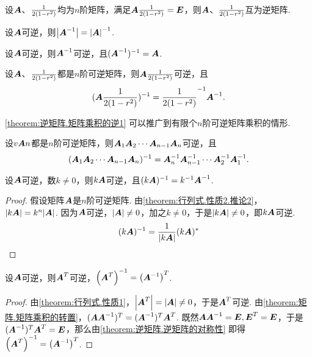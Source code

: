\begin{property}\label{theorem:逆矩阵.逆矩阵的对称性}
设\(\A\)、\(\B\)均为\(n\)阶矩阵，满足\(\A\B=\E\)，则\(\A\)、\(\B\)互为逆矩阵.
\end{property}

\begin{property}\label{theorem:逆矩阵.逆矩阵的行列式}
设\(\A\)可逆，则\(\abs{\A^{-1}}=\abs{\A}^{-1}\).
\end{property}

\begin{property}\label{theorem:逆矩阵.逆矩阵的逆}
设\(\A\)可逆，则\(\A^{-1}\)可逆，且\((\A^{-1})^{-1}=\A\).
\end{property}

\begin{property}\label{theorem:逆矩阵.矩阵乘积的逆1}
设\(\A\)、\(\B\)都是\(n\)阶可逆矩阵，则\(\A\B\)可逆，且\begin{equation}
(\A \B)^{-1} = \B^{-1} \A^{-1}.
\end{equation}
\end{property}

\cref{theorem:逆矩阵.矩阵乘积的逆1} 可以推广到有限个\(n\)阶可逆矩阵乘积的情形.
\begin{property}\label{theorem:逆矩阵.矩阵乘积的逆2}
设\(\v{\A}{n}\)都是\(n\)阶可逆矩阵，则\(\A_1 \A_2 \dotsm \A_{n-1} \A_n\)可逆，且\begin{equation}
(\A_1 \A_2 \dotsm \A_{n-1} \A_n)^{-1}
= \A_n^{-1} \A_{n-1}^{-1} \dotsm \A_2^{-1} \A_1^{-1}.
\end{equation}
\end{property}

\begin{property}\label{theorem:逆矩阵.数与矩阵乘积的逆}
设\(\A\)可逆，数\(k\neq0\)，则\(k\A\)可逆，且\((k\A)^{-1}=k^{-1}\A^{-1}\).
\begin{proof}
假设矩阵\(\A\)是\(n\)阶可逆矩阵.
由\cref{theorem:行列式.性质2.推论2}，\(\abs{k\A} = k^n\abs{\A}\).
因为\(\A\)可逆，\(\abs{\A}\neq0\)，加之\(k\neq0\)，于是\(\abs{k\A}\neq0\)，即\(k\A\)可逆.\[
(k\A)^{-1} = \frac{1}{\abs{k\A}} (k\A)^*
\]
\end{proof}
\end{property}

\begin{property}\label{theorem:逆矩阵.转置矩阵的逆与逆矩阵的转置}
设\(\A\)可逆，则\(\A^T\)可逆，\(\left(\A^T\right)^{-1}=\left(\A^{-1}\right)^T\).
\begin{proof}
由\cref{theorem:行列式.性质1}，\(\abs{\A^T}=\abs{\A}\neq0\)，于是\(\A^T\)可逆.
由\cref{theorem:矩阵.矩阵乘积的转置}，\((\A \A^{-1})^T = (\A^{-1})^T \A^T\).
既然\(\A \A^{-1} = \E, \E^T = \E\)，于是\((\A^{-1})^T \A^T = \E\)，那么由\cref{theorem:逆矩阵.逆矩阵的对称性} 即得\(\left(\A^T\right)^{-1}=\left(\A^{-1}\right)^T\).
\end{proof}
\end{property}

